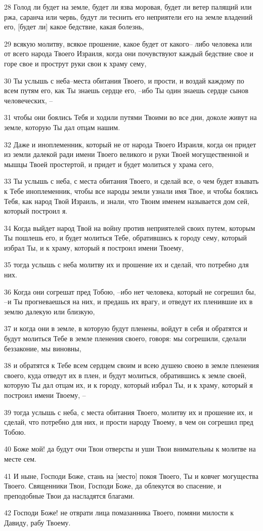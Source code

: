 \par 28 Голод ли будет на земле, будет ли язва моровая, будет ли ветер палящий или ржа, саранча или червь, будут ли теснить его неприятели его на земле владений его, [будет ли] какое бедствие, какая болезнь,
\par 29 всякую молитву, всякое прошение, какое будет от какого-- либо человека или от всего народа Твоего Израиля, когда они почувствуют каждый бедствие свое и горе свое и прострут руки свои к храму сему,
\par 30 Ты услышь с неба--места обитания Твоего, и прости, и воздай каждому по всем путям его, как Ты знаешь сердце его, --ибо Ты один знаешь сердце сынов человеческих, --
\par 31 чтобы они боялись Тебя и ходили путями Твоими во все дни, доколе живут на земле, которую Ты дал отцам нашим.
\par 32 Даже и иноплеменник, который не от народа Твоего Израиля, когда он придет из земли далекой ради имени Твоего великого и руки Твоей могущественной и мышцы Твоей простертой, и придет и будет молиться у храма сего,
\par 33 Ты услышь с неба, с места обитания Твоего, и сделай все, о чем будет взывать к Тебе иноплеменник, чтобы все народы земли узнали имя Твое, и чтобы боялись Тебя, как народ Твой Израиль, и знали, что Твоим именем называется дом сей, который построил я.
\par 34 Когда выйдет народ Твой на войну против неприятелей своих путем, которым Ты пошлешь его, и будет молиться Тебе, обратившись к городу сему, который избрал Ты, и к храму, который я построил имени Твоему,
\par 35 тогда услышь с неба молитву их и прошение их и сделай, что потребно для них.
\par 36 Когда они согрешат пред Тобою, --ибо нет человека, который не согрешил бы, --и Ты прогневаешься на них, и предашь их врагу, и отведут их пленившие их в землю далекую или близкую,
\par 37 и когда они в земле, в которую будут пленены, войдут в себя и обратятся и будут молиться Тебе в земле пленения своего, говоря: мы согрешили, сделали беззаконие, мы виновны,
\par 38 и обратятся к Тебе всем сердцем своим и всею душею своею в земле пленения своего, куда отведут их в плен, и будут молиться, обратившись к земле своей, которую Ты дал отцам их, и к городу, который избрал Ты, и к храму, который я построил имени Твоему, --
\par 39 тогда услышь с неба, с места обитания Твоего, молитву их и прошение их, и сделай, что потребно для них, и прости народу Твоему, в чем он согрешил пред Тобою.
\par 40 Боже мой! да будут очи Твои отверсты и уши Твои внимательны к молитве на месте сем.
\par 41 И ныне, Господи Боже, стань на [место] покоя Твоего, Ты и ковчег могущества Твоего. Священники Твои, Господи Боже, да облекутся во спасение, и преподобные Твои да насладятся благами.
\par 42 Господи Боже! не отврати лица помазанника Твоего, помяни милости к Давиду, рабу Твоему.


